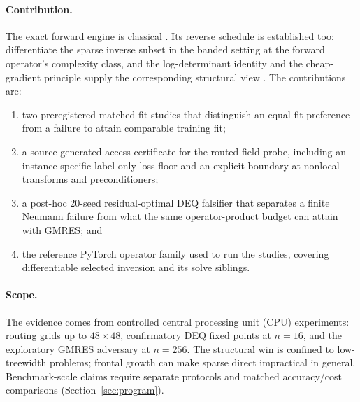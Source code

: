 \paragraph{Contribution.}
The exact forward engine is classical
\citep{takahashi1973,erismantinney1975,lin2011selinv,weiss2001correctness}.
Its reverse schedule is established too: \citet{durrande2019banded} differentiate
the sparse inverse subset in the banded setting at the forward operator's
complexity class, and the log-determinant identity and the cheap-gradient
principle supply the corresponding structural view
\citep{zhu2019sparse,dwyer1948symbolic,baur1983complexity}.
The contributions are:
\begin{enumerate}
  \item two preregistered matched-fit studies that distinguish an
        equal-fit preference from a failure to attain comparable training
        fit;
  \item a source-generated access certificate for the routed-field probe,
        including an instance-specific label-only loss floor and an explicit
        boundary at nonlocal transforms and preconditioners;
  \item a post-hoc 20-seed residual-optimal DEQ falsifier that separates a
        finite Neumann failure from what the same operator-product budget can
        attain with GMRES; and
  \item the reference PyTorch operator family used to run the studies,
        covering differentiable selected inversion and its solve siblings.
\end{enumerate}

\paragraph{Scope.}
The evidence comes from controlled central processing unit (CPU) experiments:
routing grids up to $48\times48$, confirmatory DEQ fixed points at $n=16$, and
the exploratory GMRES adversary at $n=256$. The structural win is confined to
low-treewidth problems; frontal growth can make sparse direct impractical in
general. Benchmark-scale claims require separate protocols and matched
accuracy/cost comparisons (Section~\ref{sec:program}).
